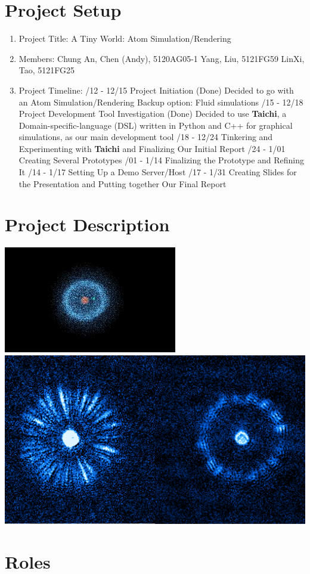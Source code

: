\documentclass[10pt]{article}
\numberwithin{equation}{section}
\begin{document}
\section{Project Setup}
\begin{enumerate}
    \item Project Title: A Tiny World: Atom Simulation/Rendering
    \item Members:
        \subitem Chung An, Chen (Andy), 5120AG05-1
        \subitem Yang, Liu, 5121FG59
        \subitem LinXi, Tao, 5121FG25
    \item Project Timeline:
        /12 - 12/15 Project Initiation (Done)
            \subsubitem Decided to go with an Atom Simulation/Rendering
            \subsubitem Backup option: Fluid simulations
        /15 - 12/18 Project Development Tool Investigation (Done) 
            \subsubitem Decided to use \textbf{Taichi}, a Domain-specific-language (DSL) written in Python and C++ for graphical simulations, as our main development tool
        /18 - 12/24 Tinkering and Experimenting with \textbf{Taichi} and Finalizing Our Initial Report
        /24 - 1/01 Creating Several Prototypes
        /01 - 1/14 Finalizing the Prototype and Refining It
        /14 - 1/17 Setting Up a Demo Server/Host
        /17 - 1/31 Creating Slides for the Presentation and Putting together Our Final Report
\end{enumerate}
\section{Project Description}

\includegraphics[scale=0.5]{./concept_1.jpeg}
\includegraphics[scale=0.5]{./concept_2.png}
\section{Roles}
\end{document}
